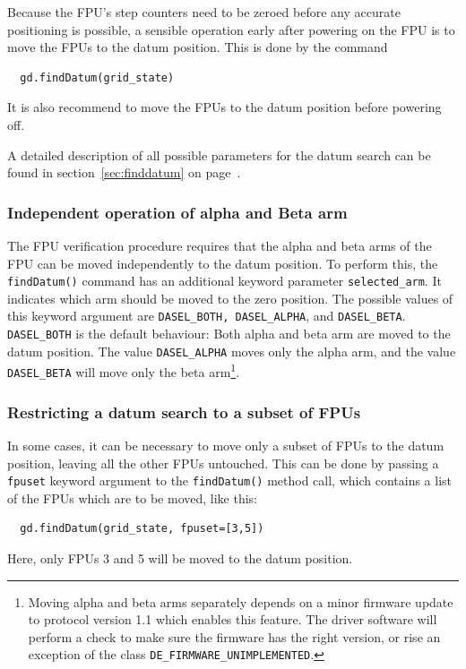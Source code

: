 \documentclass[11pt,a4paper]{scrartcl}
\begin{document}
Because the FPU's step counters need to be zeroed
before any accurate positioning is possible, a
sensible operation early after powering on
the FPU is to move the FPUs to the datum position.
This is done by the command

\begin{verbatim}
  gd.findDatum(grid_state)
\end{verbatim}

It is also recommend to move the FPUs to the datum position
before powering off. 

A detailed description of all possible
parameters for the datum search can be found in
section~\ref{sec:finddatum} on page~\pageref{sec:finddatum}.


\subsubsection{Independent operation of alpha and Beta arm}

The FPU verification procedure requires that the alpha and beta arms
of the FPU can be moved independently to the datum position.  To
perform this, the \texttt{findDatum()} command has an additional
keyword parameter \texttt{selected\_arm}. It indicates which arm
should be moved to the zero position. The possible values of this
keyword argument are \texttt{DASEL\_BOTH, DASEL\_ALPHA}, and
\texttt{DASEL\_BETA}.  \texttt{DASEL\_BOTH} is the default behaviour:
Both alpha and beta arm are moved to the datum position. The value
\texttt{DASEL\_ALPHA} moves only the alpha arm, and the value
\texttt{DASEL\_BETA} will move only the beta arm\footnote{Moving alpha
  and beta arms separately depends on a minor firmware update to
  protocol version 1.1 which enables this feature. The driver software
  will perform a check to make sure the firmware has the right
  version, or rise an exception of the class
  \texttt{DE\_FIRMWARE\_UNIMPLEMENTED}.}.


\subsubsection{Restricting a datum search to a subset of FPUs}
\label{sec:restricteddatumsearch}
  
In some cases, it can be necessary to move only a subset of FPUs to
the datum position, leaving all the other FPUs untouched. This can be
done by passing a \texttt{fpuset} keyword argument to the
\texttt{findDatum()} method call, which contains a list of the FPUs
which are to be moved, like this:
\begin{verbatim}
  gd.findDatum(grid_state, fpuset=[3,5])
\end{verbatim}
Here, only FPUs 3 and 5 will be moved to the datum position.
\end{document}
